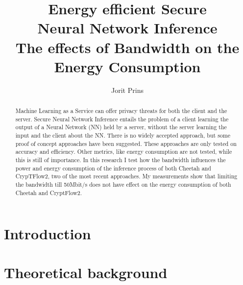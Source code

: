 \documentclass[twoside]{Style/uva-inf-bachelor-thesis}
\title{Energy efficient Secure \\Neural Network Inference
\\\large The effects of Bandwidth on the Energy Consumption}
\author{Jorit Prins}
\begin{document}
\maketitle

\begin{abstract}
Machine Learning as a Service can offer privacy threats for both the client and the server. Secure Neural Network Inference entails the problem of a client learning the output of a Neural Network (NN) held by a server, without the server learning the input and the client about the NN. There is no widely accepted approach, but some proof of concept approaches have been suggested. These approaches are only tested on accuracy and efficiency. Other metrics, like energy consumption are not tested, while this is still of importance. In this research I test how the bandwidth influences the power and energy consumption of the inference process of both Cheetah and CrypTFlow2, two of the most recent approaches. My measurements show that limiting the bandwidth till 50Mbit/s does not have effect on the energy consumption of both Cheetah and CryptFlow2.

\end{abstract}

\tableofcontents

\chapter{Introduction}\label{chap:introduction}


\chapter{Theoretical background}\label{chap:theoreticalbackground}

\end{document}
